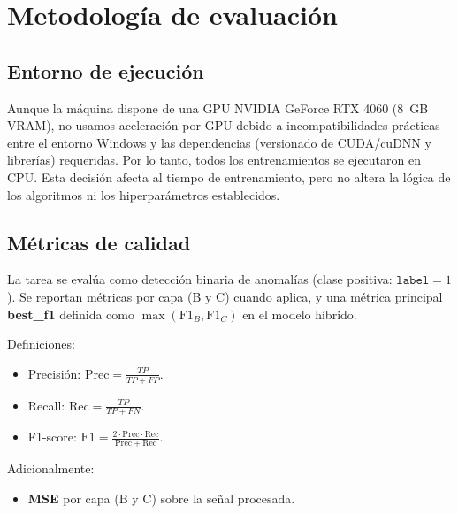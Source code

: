 \section{Metodología de evaluación}

\subsection{Entorno de ejecución} \label{subsec:entorno}
 Aunque la máquina dispone de una GPU NVIDIA GeForce RTX 4060 (8~GB VRAM), no usamos aceleración por GPU debido a incompatibilidades prácticas entre el entorno Windows y las dependencias (versionado de CUDA/cuDNN y librerías) requeridas. Por lo tanto, todos los entrenamientos se ejecutaron en CPU. Esta decisión afecta al tiempo de entrenamiento, pero no altera la lógica de los algoritmos ni los hiperparámetros establecidos.

\subsection{Métricas de calidad}
La tarea se evalúa como detección binaria de anomalías (clase positiva: \(\texttt{label} = 1\)). Se reportan métricas por capa (B y C) cuando aplica, y una métrica principal \textbf{best\_f1} definida como \(\max(\text{F1}_B, \text{F1}_C)\) en el modelo híbrido.

Definiciones:
\begin{itemize}
    \item Precisión: \(\mathrm{Prec} = \frac{TP}{TP + FP}\).
    \item Recall: \(\mathrm{Rec} = \frac{TP}{TP + FN}\).
    \item F1-score: \(\mathrm{F1} = \frac{2 \cdot \mathrm{Prec} \cdot \mathrm{Rec}}{\mathrm{Prec} + \mathrm{Rec}}\).
\end{itemize}

Adicionalmente:
\begin{itemize}
    \item \textbf{MSE} por capa (B y C) sobre la señal procesada.
\end{itemize}


